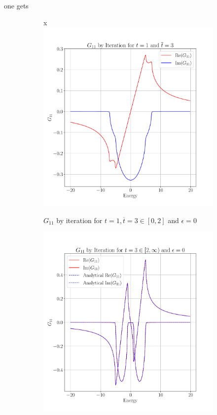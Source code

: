 one gets


\begin{figure}[hbt!]
  \begin{subfigure}{.5\linewidth}
    \centering
x    \includegraphics[width=\linewidth]{code/Double_Chain/plots/G1_tt_3.pdf}
    \caption{$G_{11}$ by iteration for $t=1, \overline{t}=3 \in [0, 2]$ and
      $\epsilon = 0$}
  \end{subfigure}
  \begin{subfigure}{.5\linewidth}
    \centering
    \includegraphics[width=\linewidth]{code/Double_Chain/plots/higher_t.pdf}

\end{subfigure}
\end{figure}

